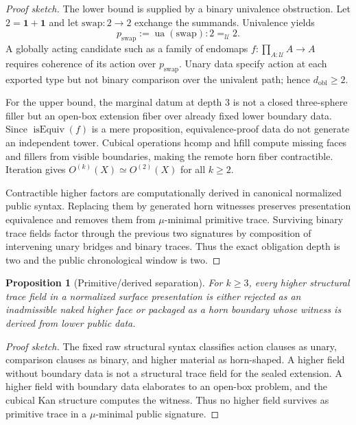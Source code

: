 \documentclass[11pt]{article}
\theoremstyle{plain}
\newtheorem{proposition}[theorem]{Proposition}
\theoremstyle{definition}
\theoremstyle{remark}
\newenvironment{proofsketch}{\begin{proof}[Proof sketch]}{\end{proof}}
\newcommand{\U}{\mathcal{U}}
\newcommand{\IsEquiv}{\operatorname{isEquiv}}
\newcommand{\ua}{\operatorname{ua}}
\begin{document}
\begin{proofsketch}
The lower bound is supplied by a binary univalence obstruction. Let \(2=\mathbf{1}+\mathbf{1}\) and let \(\mathrm{swap}:2\to2\) exchange the summands. Univalence yields
\[
p_{\mathrm{swap}}:=\ua(\mathrm{swap}):2=_{\U}2.
\]
A globally acting candidate such as a family of endomaps \(f:\prod_{A:\U}A\to A\) requires coherence of its action over \(p_{\mathrm{swap}}\). Unary data specify action at each exported type but not binary comparison over the univalent path; hence \(d_{\mathrm{obl}}\ge2\).

For the upper bound, the marginal datum at depth \(3\) is not a closed three-sphere filler but an open-box extension fiber over already fixed lower boundary data. Since \(\IsEquiv(f)\) is a mere proposition, equivalence-proof data do not generate an independent tower. Cubical operations \(\mathrm{hcomp}\) and \(\mathrm{hfill}\) compute missing faces and fillers from visible boundaries, making the remote horn fiber contractible. Iteration gives \(O^{(k)}(X)\simeq O^{(2)}(X)\) for all \(k\ge2\).

Contractible higher factors are computationally derived in canonical normalized public syntax. Replacing them by generated horn witnesses preserves presentation equivalence and removes them from \(\mu\)-minimal primitive trace. Surviving binary trace fields factor through the previous two signatures by composition of intervening unary bridges and binary traces. Thus the exact obligation depth is two and the public chronological window is two.
\end{proofsketch}

\begin{proposition}[Primitive/derived separation]
For \(k\ge3\), every higher structural trace field in a normalized surface presentation is either rejected as an inadmissible naked higher face or packaged as a horn boundary whose witness is derived from lower public data.
\end{proposition}

\begin{proofsketch}
The fixed raw structural syntax classifies action clauses as unary, comparison clauses as binary, and higher material as horn-shaped. A higher field without boundary data is not a structural trace field for the sealed extension. A higher field with boundary data elaborates to an open-box problem, and the cubical Kan structure computes the witness. Thus no higher field survives as primitive trace in a \(\mu\)-minimal public signature.
\end{proofsketch}
\end{document}
